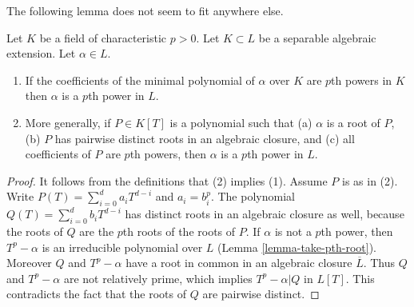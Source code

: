 \noindent
The following lemma does not seem to fit anywhere else.

\begin{lemma}
\label{lemma-pth-root}
Let $K$ be a field of characteristic $p > 0$. Let $K \subset L$ be a separable
algebraic extension. Let $\alpha \in L$.
\begin{enumerate}
\item If the coefficients of the minimal polynomial of $\alpha$
over $K$ are $p$th powers in $K$ then $\alpha$ is a $p$th
power in $L$.
\item More generally, if $P \in K[T]$ is a polynomial such that (a) $\alpha$
is a root of $P$, (b) $P$ has pairwise distinct roots in an algebraic closure,
and (c) all coefficients of $P$ are $p$th powers, then $\alpha$ is a
$p$th power in $L$.
\end{enumerate}
\end{lemma}

\begin{proof}
It follows from the definitions that (2) implies (1). Assume $P$ is as in (2).
Write $P(T) = \sum\nolimits_{i = 0}^d a_i T^{d - i}$ and $a_i = b_i^p$.
The polynomial $Q(T) = \sum\nolimits_{i = 0}^d b_i T^{d - i}$ has distinct
roots in an algebraic closure as well, because the roots of $Q$
are the $p$th roots of the roots of $P$. If $\alpha$ is not a $p$th power,
then $T^p - \alpha$ is an irreducible polynomial over $L$
(Lemma \ref{lemma-take-pth-root}).
Moreover $Q$ and $T^p - \alpha$ have a root in common in
an algebraic closure $\overline{L}$.
Thus $Q$ and $T^p - \alpha$ are not relatively prime, which
implies $T^p - \alpha | Q$ in $L[T]$. This contradicts the fact that
the roots of $Q$ are pairwise distinct.
\end{proof}


















